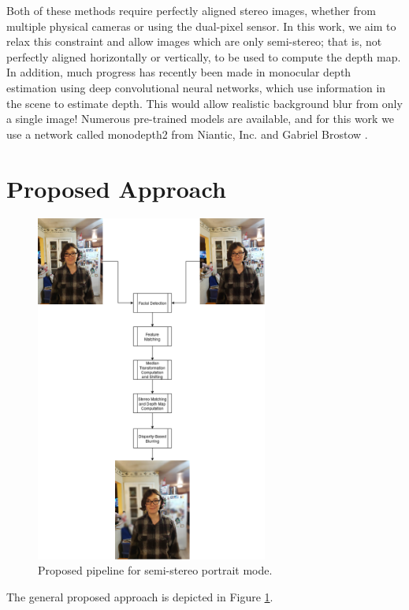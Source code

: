 \documentclass[10pt,twocolumn,letterpaper]{article}
\begin{document}
\par Both of these methods require perfectly aligned stereo images, whether from multiple physical cameras or using the dual-pixel sensor.
In this work, we aim to relax this constraint and allow images which are only semi-stereo; that is, not perfectly aligned horizontally or vertically,
to be used to compute the depth map. In addition, much progress has recently been made in monocular depth estimation using deep convolutional neural
networks, which use information in the scene to estimate depth. This would allow realistic background blur from only a single image!
Numerous pre-trained models are available, and for this work we use a network called monodepth2 from Niantic, Inc. and Gabriel Brostow \cite{monodepth2}.

\section{Proposed Approach}

\begin{figure}[!t]
    \begin{center}
        \includegraphics[width=3.0in]{resources/portrait_mode.png} %
    \end{center}
    \caption{Proposed pipeline for semi-stereo portrait mode.}
    \label{fig:pipeline}
\end{figure}

The general proposed approach is depicted in Figure \ref{fig:pipeline}.
\end{document}
